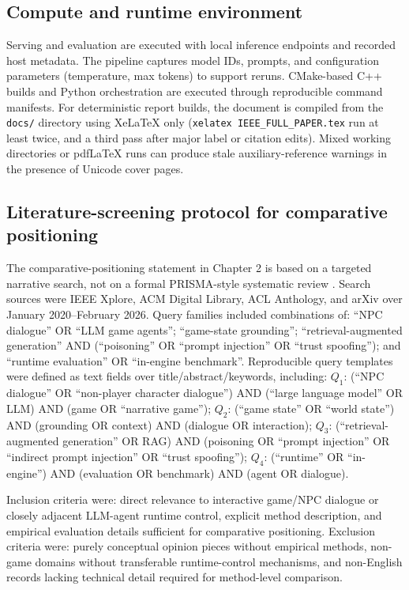 ﻿\documentclass[a4paper,12pt]{article}
\begin{document}
\subsection{Compute and runtime environment}
Serving and evaluation are executed with local inference endpoints and recorded host metadata. The pipeline captures model IDs, prompts, and configuration parameters (temperature, max tokens) to support reruns. CMake-based C++ builds and Python orchestration are executed through reproducible command manifests.
For deterministic report builds, the document is compiled from the \texttt{docs/} directory using XeLaTeX only (\texttt{xelatex IEEE\_FULL\_PAPER.tex} run at least twice, and a third pass after major label or citation edits). Mixed working directories or pdfLaTeX runs can produce stale auxiliary-reference warnings in the presence of Unicode cover pages.

\subsection{Literature-screening protocol for comparative positioning}
The comparative-positioning statement in Chapter 2 is based on a targeted narrative search, not on a formal PRISMA-style systematic review \cite{Page2021PRISMA2020}. Search sources were IEEE Xplore, ACM Digital Library, ACL Anthology, and arXiv over January 2020--February 2026. Query families included combinations of: ``NPC dialogue'' OR ``LLM game agents''; ``game-state grounding''; ``retrieval-augmented generation'' AND (``poisoning'' OR ``prompt injection'' OR ``trust spoofing''); and ``runtime evaluation'' OR ``in-engine benchmark''. Reproducible query templates were defined as text fields over title/abstract/keywords, including: \(Q_1\): (``NPC dialogue'' OR ``non-player character dialogue'') AND (``large language model'' OR LLM) AND (game OR ``narrative game''); \(Q_2\): (``game state'' OR ``world state'') AND (grounding OR context) AND (dialogue OR interaction); \(Q_3\): (``retrieval-augmented generation'' OR RAG) AND (poisoning OR ``prompt injection'' OR ``indirect prompt injection'' OR ``trust spoofing''); \(Q_4\): (``runtime'' OR ``in-engine'') AND (evaluation OR benchmark) AND (agent OR dialogue).

Inclusion criteria were: direct relevance to interactive game/NPC dialogue or closely adjacent LLM-agent runtime control, explicit method description, and empirical evaluation details sufficient for comparative positioning. Exclusion criteria were: purely conceptual opinion pieces without empirical methods, non-game domains without transferable runtime-control mechanisms, and non-English records lacking technical detail required for method-level comparison.
\end{document}
